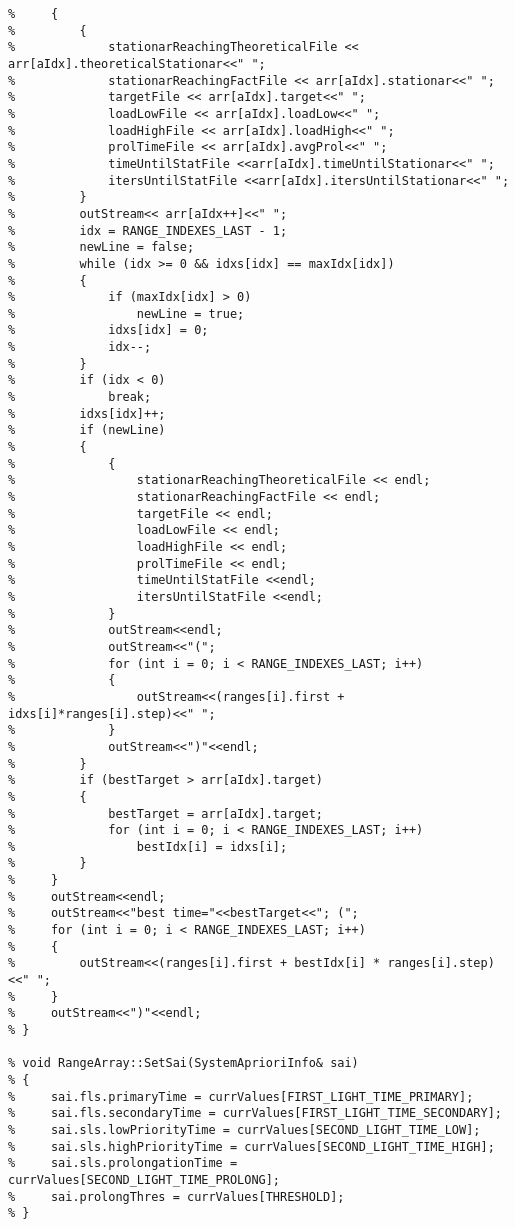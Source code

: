 \begin{lstlisting}[language={[ISO]C++}]
%     while (1)
%     {
%         {
%             stationarReachingTheoreticalFile << arr[aIdx].theoreticalStationar<<" ";
%             stationarReachingFactFile << arr[aIdx].stationar<<" ";
%             targetFile << arr[aIdx].target<<" ";
%             loadLowFile << arr[aIdx].loadLow<<" ";
%             loadHighFile << arr[aIdx].loadHigh<<" ";
%             prolTimeFile << arr[aIdx].avgProl<<" ";
%             timeUntilStatFile <<arr[aIdx].timeUntilStationar<<" ";
%             itersUntilStatFile <<arr[aIdx].itersUntilStationar<<" ";
%         }
%         outStream<< arr[aIdx++]<<" ";
%         idx = RANGE_INDEXES_LAST - 1;
%         newLine = false;
%         while (idx >= 0 && idxs[idx] == maxIdx[idx])
%         {
%             if (maxIdx[idx] > 0)
%                 newLine = true;
%             idxs[idx] = 0;
%             idx--;
%         }
%         if (idx < 0)
%             break;
%         idxs[idx]++;
%         if (newLine)
%         {
%             {
%                 stationarReachingTheoreticalFile << endl;
%                 stationarReachingFactFile << endl;
%                 targetFile << endl;
%                 loadLowFile << endl;
%                 loadHighFile << endl;
%                 prolTimeFile << endl;
%                 timeUntilStatFile <<endl;
%                 itersUntilStatFile <<endl;
%             }
%             outStream<<endl;
%             outStream<<"(";
%             for (int i = 0; i < RANGE_INDEXES_LAST; i++)
%             {
%                 outStream<<(ranges[i].first + idxs[i]*ranges[i].step)<<" ";
%             }
%             outStream<<")"<<endl;
%         }
%         if (bestTarget > arr[aIdx].target)
%         {
%             bestTarget = arr[aIdx].target;
%             for (int i = 0; i < RANGE_INDEXES_LAST; i++)
%                 bestIdx[i] = idxs[i];
%         }
%     }
%     outStream<<endl;
%     outStream<<"best time="<<bestTarget<<"; (";
%     for (int i = 0; i < RANGE_INDEXES_LAST; i++)
%     {
%         outStream<<(ranges[i].first + bestIdx[i] * ranges[i].step)<<" ";
%     }
%     outStream<<")"<<endl;
% }

% void RangeArray::SetSai(SystemAprioriInfo& sai)
% {
%     sai.fls.primaryTime = currValues[FIRST_LIGHT_TIME_PRIMARY];
%     sai.fls.secondaryTime = currValues[FIRST_LIGHT_TIME_SECONDARY];
%     sai.sls.lowPriorityTime = currValues[SECOND_LIGHT_TIME_LOW];
%     sai.sls.highPriorityTime = currValues[SECOND_LIGHT_TIME_HIGH];
%     sai.sls.prolongationTime = currValues[SECOND_LIGHT_TIME_PROLONG];
%     sai.prolongThres = currValues[THRESHOLD];
% }


\end{lstlisting}
